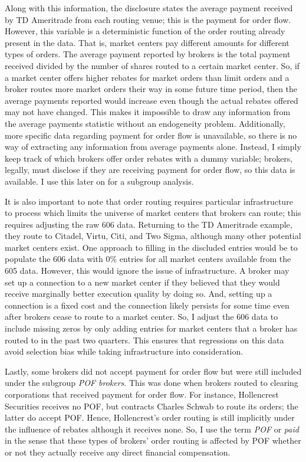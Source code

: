 \documentclass[11pt,a4paper]{article}
\begin{document}
		Along with this information, the disclosure states the average payment received by TD Ameritrade from each routing venue; this is the payment for order flow. However, this variable is a deterministic function of the order routing already present in the data. That is, market centers pay different amounts for different types of orders. The average payment reported by brokers is the total payment received divided by the number of shares routed to a certain market center. So, if a market center offers higher rebates for market orders than limit orders and a broker routes more market orders their way in some future time period, then the average payments reported would increase even though the actual rebates offered may not have changed. This makes it impossible to draw any information from the average payments statistic without an endogeneity problem. Additionally, more specific data regarding payment for order flow is unavailable, so there is no way of extracting any information from average payments alone. Instead, I simply keep track of which brokers offer order rebates with a dummy variable; brokers, legally, must disclose if they are receiving payment for order flow, so this data is available. I use this later on for a subgroup analysis. 
		
		It is also important to note that order routing requires particular infrastructure to process which limits the universe of market centers that brokers can route; this requires adjusting the raw 606 data. Returning to the TD Ameritrade example, they route to Citadel, Virtu, Citi, and Two Sigma, although many other potential market centers exist. One approach to filling in the discluded entries would be to populate the 606 data with 0\% entries for all market centers available from the 605 data. However, this would ignore the issue of infrastructure. A broker may set up a connection to a new market center if they believed that they would receive marginally better execution quality by doing so. And, setting up a connection is a fixed cost and the connection likely persists for some time even after brokers cease to route to a market center. So, I adjust the 606 data to include missing zeros by only adding entries for market centers that a broker has routed to in the past two quarters. This ensures that regressions on this data avoid selection bias while taking infrastructure into consideration. 
		
		Lastly, some brokers did not accept payment for order flow but were still included under the subgroup \textit{POF brokers}. This was done when brokers routed to clearing corporations that received payment for order flow. For instance, Hollencrest Securities receives no POF, but contracts Charles Schwab to route its orders; the latter do accept POF. Hence, Hollencrest's order routing is still implicitly under the influence of rebates although it receives none. So, I use the term \textit{POF} or \textit{paid} in the sense that these types of brokers' order routing is affected by POF whether or not they actually receive any direct financial compensation.
		
\end{document}
